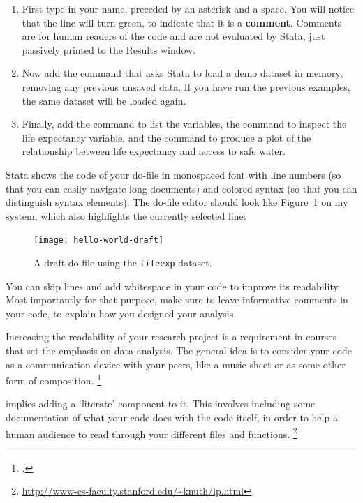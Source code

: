 \begin{enumerate}
  \item First type in your name, preceded by an asterisk and a space. You will notice that the line will turn green, to indicate that it is a \textbf{comment}. Comments are for human readers of the code and are not evaluated by Stata, just passively printed to the Results window.%
  
  \item Now add the  command that asks Stata to load a demo dataset in memory, removing any previous unsaved data. If you have run the previous examples, the same dataset will be loaded again.%
  
  \item Finally, add the  command to list the variables, the  command to inspect the life expectancy variable, and the  command to produce a plot of the relationship between life expectancy and access to safe water.%
\end{enumerate}

Stata shows the code of your do-file in monospaced font with line numbers (so that you can easily navigate long documents) and colored syntax (so that you can distinguish syntax elements). The do-file editor should look like Figure~\ref{fig:hello-world-draft} on my system, which also highlights the currently selected line:%

\begin{figure}%
  \texttt{[image: hello-world-draft]}%
  \caption{A draft do-file using the \texttt{lifeexp} dataset.}%
  \label{fig:hello-world-draft}%
\end{figure}


%
 You can skip lines and add whitespace in your code to improve its readability. Most importantly for that purpose, make sure to leave informative comments in your code, to explain how you designed your analysis.%

Increasing the readability of your research project is a requirement in courses that set the emphasis on data analysis. The general idea is to consider your code as a communication device with your peers, like a music sheet or as some other form of composition.%
  \footcite{WickhamGrolemund:2013} %

%
 implies adding a `literate' component to it. This involves including some documentation of what your code does with the code itself, in order to help a human audience to read through your different files and functions.%
  \footnote{\url{http://www-cs-faculty.stanford.edu/~knuth/lp.html}} %

